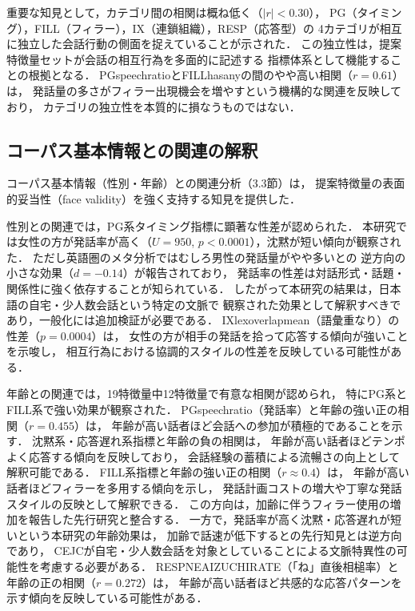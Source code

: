 \documentclass[dvipdfmx,11pt,a4paper]{bxjsarticle}
\renewcommand{\_}{\paperorigunderscore\allowbreak}%
\begin{document}
重要な知見として，カテゴリ間の相関は概ね低く（$|r| < 0.30$），
PG（タイミング），FILL（フィラー），IX（連鎖組織），RESP（応答型）の
4カテゴリが相互に独立した会話行動の側面を捉えていることが示された．
この独立性は，提案特徴量セットが会話の相互行為を多面的に記述する
指標体系として機能することの根拠となる．
PG\_speech\_ratioとFILL\_has\_anyの間のやや高い相関（$r = 0.61$）は，
発話量の多さがフィラー出現機会を増やすという機構的な関連を反映しており，
カテゴリの独立性を本質的に損なうものではない．

\subsection{コーパス基本情報との関連の解釈}

コーパス基本情報（性別・年齢）との関連分析（3.3節）は，
提案特徴量の表面的妥当性（face validity）を強く支持する知見を提供した．

性別との関連では，PG系タイミング指標に顕著な性差が認められた．
本研究では女性の方が発話率が高く（$U = 950$, $p < 0.0001$），沈黙が短い傾向が観察された．
ただし英語圏のメタ分析\cite{leaper2007}ではむしろ男性の発話量がやや多いとの
逆方向の小さな効果（$d = -0.14$）が報告されており，
発話率の性差は対話形式・話題・関係性に強く依存することが知られている\cite{bortfeld2001}．
したがって本研究の結果は，日本語の自宅・少人数会話という特定の文脈で
観察された効果として解釈すべきであり，一般化には追加検証が必要である．
IX\_lex\_overlap\_mean（語彙重なり）の性差（$p = 0.0004$）は，
女性の方が相手の発話を拾って応答する傾向が強いことを示唆し，
相互行為における協調的スタイルの性差を反映している可能性がある．

年齢との関連では，19特徴量中12特徴量で有意な相関が認められ，
特にPG系とFILL系で強い効果が観察された．
PG\_speech\_ratio（発話率）と年齢の強い正の相関（$r = 0.455$）は，
年齢が高い話者ほど会話への参加が積極的であることを示す．
沈黙系・応答遅れ系指標と年齢の負の相関は，
年齢が高い話者ほどテンポよく応答する傾向を反映しており，
会話経験の蓄積による流暢さの向上として解釈可能である．
FILL系指標と年齢の強い正の相関（$r \approx 0.4$）は，
年齢が高い話者ほどフィラーを多用する傾向を示し，
発話計画コストの増大や丁寧な発話スタイルの反映として解釈できる．
この方向は，加齢に伴うフィラー使用の増加を報告した先行研究\cite{bortfeld2001,horton2010}と整合する．
一方で，発話率が高く沈黙・応答遅れが短いという本研究の年齢効果は，
加齢で話速が低下するとの先行知見\cite{horton2010}とは逆方向であり，
CEJCが自宅・少人数会話を対象としていることによる文脈特異性の可能性を考慮する必要がある．
RESP\_NE\_AIZUCHI\_RATE（「ね」直後相槌率）と年齢の正の相関（$r = 0.272$）は，
年齢が高い話者ほど共感的な応答パターンを示す傾向を反映している可能性がある．
\end{document}
